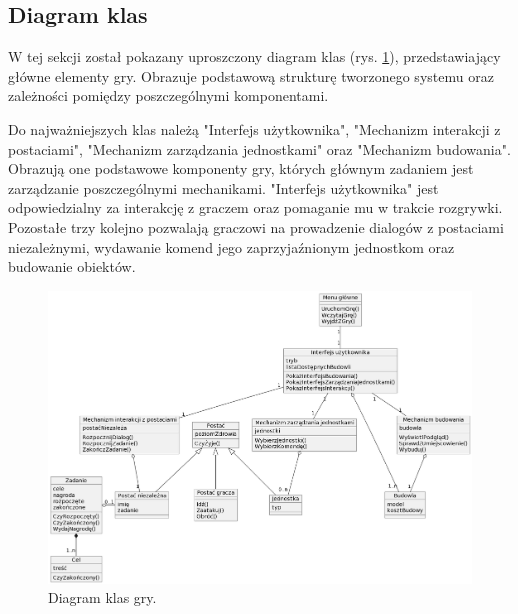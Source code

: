 \subsection{Diagram klas}\label{ss:class}
W tej sekcji został pokazany uproszczony diagram klas (rys. \ref{fig:classes_d}), przedstawiający główne elementy gry.
Obrazuje podstawową strukturę tworzonego systemu oraz zależności pomiędzy poszczególnymi komponentami.

Do najważniejszych klas należą "Interfejs użytkownika", "Mechanizm interakcji z postaciami", "Mechanizm zarządzania
jednostkami" oraz "Mechanizm budowania". Obrazują one podstawowe komponenty gry, których głównym zadaniem jest zarządzanie
poszczególnymi mechanikami. "Interfejs użytkownika" jest odpowiedzialny za interakcję z graczem oraz pomaganie mu w
trakcie rozgrywki. Pozostałe trzy kolejno pozwalają graczowi na prowadzenie dialogów z postaciami
niezależnymi, wydawanie komend jego zaprzyjaźnionym jednostkom oraz budowanie obiektów.
\begin{figure}[!htbp]
    \centering
    \includegraphics[width=1.0\textwidth]{images/diagrams/class.jpg}
    \caption{Diagram klas gry.}\label{fig:classes_d}
\end{figure}
